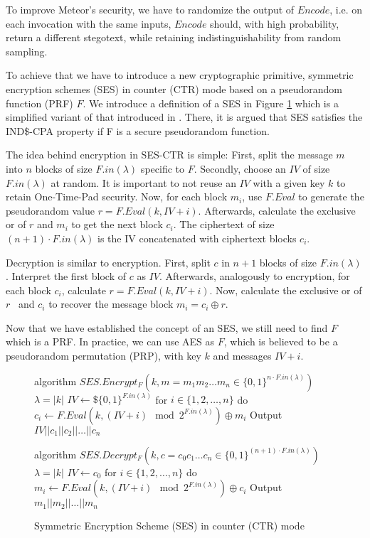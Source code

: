 To improve Meteor's security, we have to randomize the output of $Encode$, i.e. on each invocation with the same inputs, $Encode$ should, with high probability, return a different stegotext, while retaining indistinguishability from random sampling.

To achieve that we have to introduce a new cryptographic primitive, symmetric encryption schemes (SES) in counter (CTR) mode based on a pseudorandom function (PRF) $F$.
We introduce a definition of a SES in Figure \ref{fig:ses} which is a simplified variant of that introduced in \cite{Berndt2017}.
There, it is argued that SES satisfies the IND\$-CPA property if F is a secure pseudorandom function.

The idea behind encryption in SES-CTR is simple:
First, split the message $m$ into $n$ blocks of size $F.in(\lambda)$ specific to $F$.
Secondly, choose an $IV$ of size $F.in(\lambda)$ at random.
It is important to not reuse an $IV$ with a given key $k$ to retain One-Time-Pad security.
Now, for each block $m_i$, use $F.Eval$ to generate the pseudorandom value $r = F.Eval(k, IV+i)$.
Afterwards, calculate the exclusive or of $r$ and $m_i$ to get the next block $c_i$.
The ciphertext of size $(n+1)\cdot F.in(\lambda)$ is the IV concatenated with ciphertext blocks $c_i$.

Decryption is similar to encryption.
First, split $c$ in $n+1$ blocks of size $F.in(\lambda)$.
Interpret the first block of $c$ as $IV$.
Afterwards, analogously to encryption, for each block $c_i$, calculate $r = F.Eval(k, IV+i)$.
Now, calculate the exclusive or of $r$~ and $c_i$ to recover the message block $m_i = c_i \oplus r$.

Now that we have established the concept of an SES, we still need to find $F$ which is a PRF.
In practice, we can use AES as $F$, which is believed to be a pseudorandom permutation (PRP), with key $k$ and messages $IV+i$.

\begin{figure}[htbp]%
	\centering%
	\begin{Pseudocode}%
algorithm $SES.Encrypt_F(k, m=m_1 m_2 \dots m_n \in \{0,1\}^{n\cdot F.in(\lambda)})$
	$\lambda = |k|$
	$IV \leftarrow\$ \{0,1\}^{F.in(\lambda)}$
	for $i \in \{ 1, 2, \dots, n \}$ do
		$c_i \leftarrow F.Eval(k, (IV+i) \mod 2^{F.in(\lambda)}) \oplus m_i$
	Output $IV||c_1||c_2||\dots||c_n$
	\end{Pseudocode}%
	\begin{Pseudocode}%
algorithm $SES.Decrypt_F(k, c=c_0 c_1 \dots c_n \in \{0,1\}^{(n+1)\cdot F.in(\lambda)})$
	$\lambda = |k|$
	$IV \leftarrow c_0$
	for $i \in \{ 1, 2, \dots, n \}$ do
		$m_i \leftarrow F.Eval(k, (IV+i) \mod 2^{F.in(\lambda)}) \oplus c_i$
	Output $m_1||m_2||\dots||m_n$
	\end{Pseudocode}%
	\caption{Symmetric Encryption Scheme (SES) in counter (CTR) mode}%
	\label{fig:ses}%
\end{figure}%


